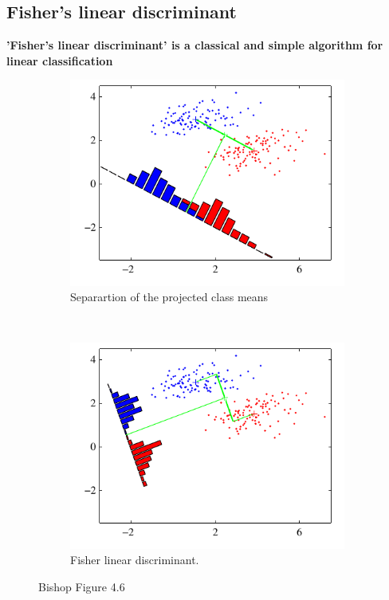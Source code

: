 \subsection{Fisher's linear discriminant}
\textbf{'Fisher's linear discriminant' is a classical and simple algorithm for linear classification} 


\begin{figure}
	\centering
	\begin{subfigure}[b]{0.45\textwidth}
		\includegraphics[width=\textwidth]{./lecture6/Figure46a.pdf}
		\caption{Separartion of the projected class means}
	\end{subfigure}
	~
	\begin{subfigure}[b]{0.45\textwidth}
		\includegraphics[width=\textwidth]{./lecture6/Figure46b.pdf}
		\caption{Fisher linear discriminant.}
	\end{subfigure}
	\caption{Bishop Figure 4.6}
\end{figure}


